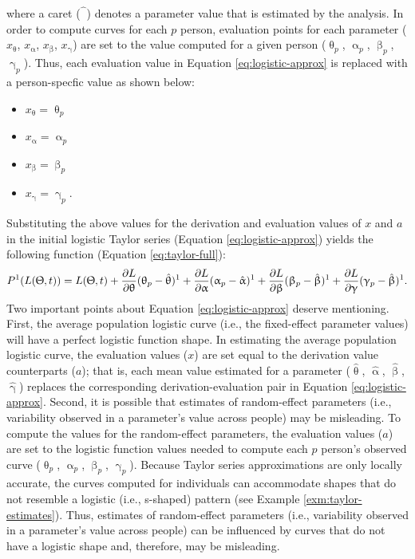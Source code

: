 \documentclass[
12pt, %
twoside,
english]{guelphthesis}
\begin{document}
\noindent where a caret (\(\hat{\phantom{\beta}}\)) denotes a parameter value that is estimated by the analysis. In order to compute curves for each \(p\) person, evaluation points for each parameter (\(x_{\uptheta}\), \(x_{\upalpha}\), \(x_{\upbeta}\), \(x_{\upgamma}\)) are set to the value computed for a given person (\(\uptheta_p\), \(\upalpha_p\), \(\upbeta_p\), \(\upgamma_p\)). Thus, each evaluation value in Equation \ref{eq:logistic-approx} is replaced with a person-specfic value as shown below:
\begin{itemize}
\tightlist
\item
  \(x_{\uptheta} = \uptheta_p\)
\item
  \(x_{\upalpha} = \upalpha_p\)
\item
  \(x_{\upbeta} = \upbeta_p\)
\item
  \(x_{\upgamma} = \upgamma_p\).
\end{itemize}
\noindent Substituting the above values for the derivation and evaluation values of \(x\) and \(a\) in the initial logistic Taylor series (Equation \ref{eq:logistic-approx}) yields the following function (Equation \ref{eq:taylor-full}):
\begin{align}
 P^1(L(\Uptheta, t)) = L(\Uptheta, t) + \frac{\partial L}{\partial \uptheta}(\uptheta_p-\hat{\uptheta})^1 + \frac{\partial L}{\partial \upalpha}(\upalpha_p-\hat{\upalpha})^1 + \frac{\partial L}{\partial \upbeta}(\upbeta_p-\hat{\upbeta})^1 + \frac{\partial L}{\partial \upgamma}(\upgamma_p-\hat{\upbeta})^1.
\label{eq:taylor-full}
\end{align}
Two important points about Equation \ref{eq:logistic-approx} deserve mentioning. First, the average population logistic curve (i.e., the fixed-effect parameter values) will have a perfect logistic function shape. In estimating the average population logistic curve, the evaluation values (\(x\)) are set equal to the derivation value counterparts (\(a\)); that is, each mean value estimated for a parameter (\(\hat{\uptheta}\), \(\hat{\upalpha}\), \(\hat{\upbeta}\), \(\hat{\upgamma}\)) replaces the corresponding derivation-evaluation pair in Equation \ref{eq:logistic-approx}. Second, it is possible that estimates of random-effect parameters (i.e., variability observed in a parameter's value across people) may be misleading. To compute the values for the random-effect parameters, the evaluation values (\(a\)) are set to the logistic function values needed to compute each \(p\) person's observed curve (\(\uptheta_p\), \(\upalpha_p\), \(\upbeta_p\), \(\upgamma_p\)). Because Taylor series approximations are only locally accurate, the curves computed for individuals can accommodate shapes that do not resemble a logistic (i.e., s-shaped) pattern (see Example \ref{exm:taylor-estimates}). Thus, estimates of random-effect parameters (i.e., variability observed in a parameter's value across people) can be influenced by curves that do not have a logistic shape and, therefore, may be misleading.
\end{document}
